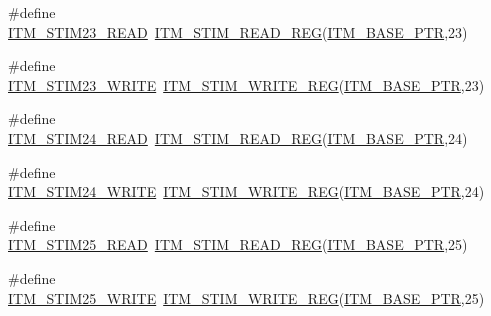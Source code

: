 \begin{DoxyCompactItemize}
\item 
\#define \hyperlink{group___i_t_m___register___accessor___macros_gaa2155b2b5a6c7d6a8a3cc643a4bd4af6}{I\+T\+M\+\_\+\+S\+T\+I\+M23\+\_\+\+R\+E\+AD}~\hyperlink{group___i_t_m___register___accessor___macros_ga5009882336aadcd4f37b45cf3395c450}{I\+T\+M\+\_\+\+S\+T\+I\+M\+\_\+\+R\+E\+A\+D\+\_\+\+R\+EG}(\hyperlink{group___i_t_m___peripheral_gafaddee8fe8b6a898d4e5edc43ee0d703}{I\+T\+M\+\_\+\+B\+A\+S\+E\+\_\+\+P\+TR},23)
\item 
\#define \hyperlink{group___i_t_m___register___accessor___macros_gaca71beb45d1448267f6f0f4ae952ce42}{I\+T\+M\+\_\+\+S\+T\+I\+M23\+\_\+\+W\+R\+I\+TE}~\hyperlink{group___i_t_m___register___accessor___macros_ga049ca92a4e78e77c19af81e51aa73f1c}{I\+T\+M\+\_\+\+S\+T\+I\+M\+\_\+\+W\+R\+I\+T\+E\+\_\+\+R\+EG}(\hyperlink{group___i_t_m___peripheral_gafaddee8fe8b6a898d4e5edc43ee0d703}{I\+T\+M\+\_\+\+B\+A\+S\+E\+\_\+\+P\+TR},23)
\item 
\#define \hyperlink{group___i_t_m___register___accessor___macros_ga114f7258f85d135f2e6e5f6bf2fff8a6}{I\+T\+M\+\_\+\+S\+T\+I\+M24\+\_\+\+R\+E\+AD}~\hyperlink{group___i_t_m___register___accessor___macros_ga5009882336aadcd4f37b45cf3395c450}{I\+T\+M\+\_\+\+S\+T\+I\+M\+\_\+\+R\+E\+A\+D\+\_\+\+R\+EG}(\hyperlink{group___i_t_m___peripheral_gafaddee8fe8b6a898d4e5edc43ee0d703}{I\+T\+M\+\_\+\+B\+A\+S\+E\+\_\+\+P\+TR},24)
\item 
\#define \hyperlink{group___i_t_m___register___accessor___macros_gaba2149ea4a29fd70514c8e637a6cedd9}{I\+T\+M\+\_\+\+S\+T\+I\+M24\+\_\+\+W\+R\+I\+TE}~\hyperlink{group___i_t_m___register___accessor___macros_ga049ca92a4e78e77c19af81e51aa73f1c}{I\+T\+M\+\_\+\+S\+T\+I\+M\+\_\+\+W\+R\+I\+T\+E\+\_\+\+R\+EG}(\hyperlink{group___i_t_m___peripheral_gafaddee8fe8b6a898d4e5edc43ee0d703}{I\+T\+M\+\_\+\+B\+A\+S\+E\+\_\+\+P\+TR},24)
\item 
\#define \hyperlink{group___i_t_m___register___accessor___macros_ga5e80b2d49c4833d6faa2843b39cc71e0}{I\+T\+M\+\_\+\+S\+T\+I\+M25\+\_\+\+R\+E\+AD}~\hyperlink{group___i_t_m___register___accessor___macros_ga5009882336aadcd4f37b45cf3395c450}{I\+T\+M\+\_\+\+S\+T\+I\+M\+\_\+\+R\+E\+A\+D\+\_\+\+R\+EG}(\hyperlink{group___i_t_m___peripheral_gafaddee8fe8b6a898d4e5edc43ee0d703}{I\+T\+M\+\_\+\+B\+A\+S\+E\+\_\+\+P\+TR},25)
\item 
\#define \hyperlink{group___i_t_m___register___accessor___macros_ga63f5197346498fb81ab45a43ebc85819}{I\+T\+M\+\_\+\+S\+T\+I\+M25\+\_\+\+W\+R\+I\+TE}~\hyperlink{group___i_t_m___register___accessor___macros_ga049ca92a4e78e77c19af81e51aa73f1c}{I\+T\+M\+\_\+\+S\+T\+I\+M\+\_\+\+W\+R\+I\+T\+E\+\_\+\+R\+EG}(\hyperlink{group___i_t_m___peripheral_gafaddee8fe8b6a898d4e5edc43ee0d703}{I\+T\+M\+\_\+\+B\+A\+S\+E\+\_\+\+P\+TR},25)

\end{DoxyCompactItemize}

